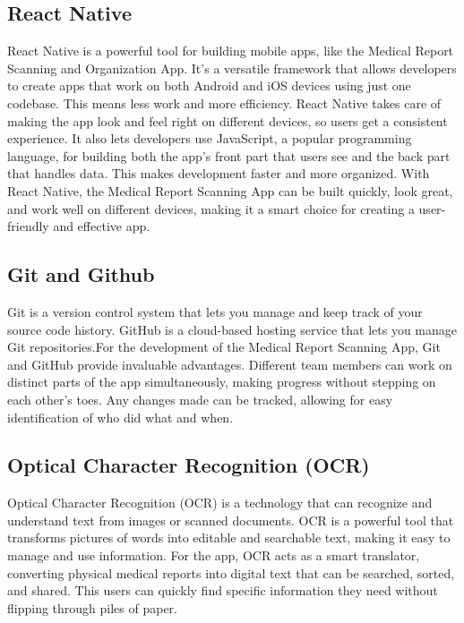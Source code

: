 \subsection*{React Native}
React Native is a powerful tool for building mobile apps, like the Medical Report Scanning and Organization App. It's  a versatile framework that allows developers to create apps that work on both Android and iOS devices using just one codebase. This means less work and more efficiency. React Native takes care of making the app look and feel right on different devices, so users get a consistent experience. It also lets developers use JavaScript, a popular programming language, for building both the app's front part that users see and the back part that handles data. This makes development faster and more organized. With React Native, the Medical Report Scanning  App can be built quickly, look great, and work well on different devices, making it a smart choice for creating a user-friendly and effective app.
\subsection*{Git and Github}
Git is a version control system that lets you manage and keep track of your source code history. GitHub is a cloud-based hosting service that lets you manage Git repositories.For the development of the Medical Report Scanning App, Git and GitHub provide invaluable advantages. Different team members can work on distinct parts of the app simultaneously, making progress without stepping on each other's toes. Any changes made can be tracked, allowing for easy identification of who did what and when.
\subsection*{Optical Character Recognition (OCR)}
Optical Character Recognition (OCR) is a  technology  that can recognize and understand text from images or scanned documents. OCR is a powerful tool that transforms pictures of words into editable and searchable text, making it easy to manage and use information. For the app, OCR acts as a smart translator, converting physical medical reports into digital text that can be searched, sorted, and shared. This users can quickly find specific information they need without flipping through piles of paper.








